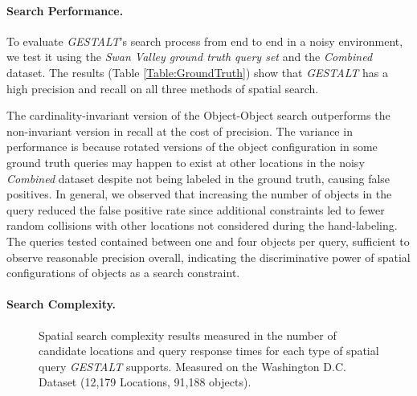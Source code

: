 \paragraph{Search Performance.}

To evaluate \emph{GESTALT}'s search process from end to end in a noisy environment, we test it using the \textit{Swan Valley ground truth query set} and the \textit{Combined} dataset.
The results (Table \ref{Table:GroundTruth}) show that \emph{GESTALT} has a high precision and recall on all three methods of spatial search.

The cardinality-invariant version of the Object-Object search outperforms the non-invariant version in recall at the cost of precision.
The variance in performance is because rotated versions of the object configuration in some ground truth queries may happen to exist at other locations in the noisy \textit{Combined} dataset despite not being labeled in the ground truth, causing false positives.
In general, we observed that increasing the number of objects in the query reduced the false positive rate since additional constraints led to fewer random collisions with other locations not considered during the hand-labeling.
The queries tested contained between one and four objects per query, sufficient to observe reasonable precision overall, indicating the discriminative power of spatial configurations of objects as a search constraint.



\paragraph{Search Complexity.}

\small{
\begin{figure*}[h]
    \vspace{-12pt}
    \centering
    \begin{subfigure}[t]{.45\textwidth}
        
        
            \end{subfigure}
    \hfill
    \begin{subfigure}[t]{.45\textwidth} 
        
            \end{subfigure}

    \caption{Spatial search complexity results measured in the number of candidate locations and query response times for each type of spatial query \emph{GESTALT} supports. Measured on the Washington D.C. Dataset (12,179 Locations, 91,188 objects).}\label{figure:PerformanceExperiments}\label{fig:queryExecutionRecall}        \label{fig:queryExecutionTime}
        \vspace{-10pt}
\end{figure*}
}
\normalsize





